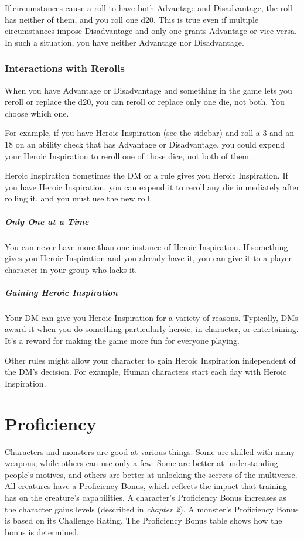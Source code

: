 \documentclass[10pt,a4paper,twoside,bg=print,twocolumn,openany,nodeprecatedcode]{dndbook}
\begin{document}
If circumstances cause a roll to have both Advantage and Disadvantage, the roll has neither of them, and you roll one d20. This is true even if multiple circumstances impose Disadvantage and only one grants Advantage or vice versa. In such a situation, you have neither Advantage nor Disadvantage.

\subsubsection{Interactions with Rerolls}
When you have Advantage or Disadvantage and something in the game lets you reroll or replace the d20, you can reroll or replace only one die, not both. You choose which one.

For example, if you have Heroic Inspiration (see the sidebar) and roll a 3 and an 18 on an ability check that has Advantage or Disadvantage, you could expend your Heroic Inspiration to reroll one of those dice, not both of them.

\begin{DndSidebar}[float=!b]{Heroic Inspiration}
Sometimes the DM or a rule gives you Heroic Inspiration. If you have Heroic Inspiration, you can expend it to reroll any die immediately after rolling it, and you must use the new roll.



\subparagraph{Only One at a Time}
You can never have more than one instance of Heroic Inspiration. If something gives you Heroic Inspiration and you already have it, you can give it to a player character in your group who lacks it.



\subparagraph{Gaining Heroic Inspiration}
Your DM can give you Heroic Inspiration for a variety of reasons. Typically, DMs award it when you do something particularly heroic, in character, or entertaining. It's a reward for making the game more fun for everyone playing.

Other rules might allow your character to gain Heroic Inspiration independent of the DM's decision. For example, Human characters start each day with Heroic Inspiration.



\end{DndSidebar}

\section{Proficiency}
Characters and monsters are good at various things. Some are skilled with many weapons, while others can use only a few. Some are better at understanding people's motives, and others are better at unlocking the secrets of the multiverse. All creatures have a Proficiency Bonus, which reflects the impact that training has on the creature's capabilities. A character's Proficiency Bonus increases as the character gains levels (described in \textit{chapter 2}). A monster's Proficiency Bonus is based on its Challenge Rating. The Proficiency Bonus table shows how the bonus is determined.
\end{document}
